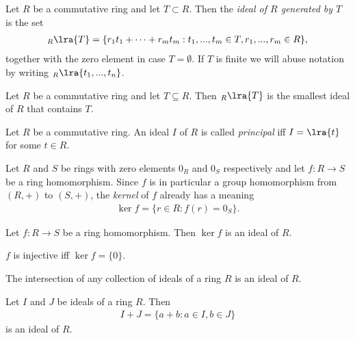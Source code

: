 \documentclass{article}
\begin{document}
\begin{definition}
	Let $R$ be a commutative ring and let $T\subset R$. Then the \emph{ideal of $R$
		generated by $T$} is the set
	\begin{align*}
		_R\lra{T} = \{r_1t_1+\cdots+r_mt_m : t_1,...,t_m\in T,r_1,...,r_m\in R\},
	\end{align*}
	together with the zero element in case $T=\emptyset$. If $T$ is finite we will
	abuse notation by writing $_R\lra{t_1,...,t_n}$.
\end{definition}

\begin{proposition}[Proposition 3.4.14]
	Let $R$ be a commutative ring and let $T\subseteq R$. Then $_R\lra{T}$ is the
	smallest ideal of $R$ that contains $T$.
\end{proposition}

\begin{definition}
	Let $R$ be a commutative ring. An ideal $I$ of $R$ is called \emph{principal} iff
	$I=\lra{t}$ for some $t\in R$.
\end{definition}

\begin{definition}
	Let $R$ and $S$ be rings with zero elements $0_R$ and $0_S$ respectively and
	let $f:R\to S$ be a ring homomorphism. Since $f$ is in particular a group homomorphism
	from $(R,+)$ to $(S,+)$, the \emph{kernel} of $f$ already has a meaning
	\begin{align*}
		\ker f = \{r\in R : f(r) = 0_S\}.
	\end{align*}
\end{definition}

\begin{proposition}[Proposition 3.4.18]
	Let $f:R\to S$ be a ring homomorphism. Then $\ker f$ is an ideal of $R$.
\end{proposition}

\begin{lemma}[Lemma 3.4.20]
	$f$ is injective iff $\ker f = \{0\}$.
\end{lemma}

\begin{lemma}[Lemma 3.4.21]
	The intersection of any collection of ideals of a ring $R$ is an ideal of $R$.
\end{lemma}

\begin{lemma}[Lemma 3.4.22]
	Let $I$ and $J$ be ideals of a ring $R$. Then
	\begin{align*}
		I+J=\{a+b:a\in I, b\in J\}
	\end{align*}
	is an ideal of $R$.
\end{lemma}
\end{document}
